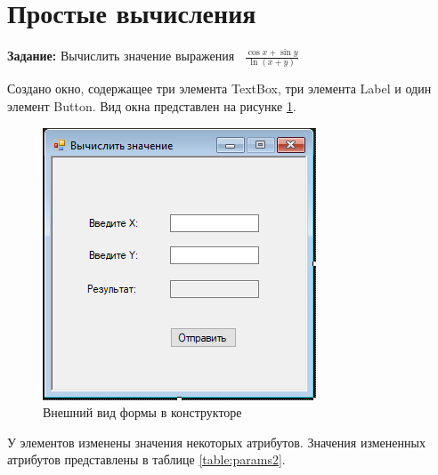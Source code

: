 \section{Простые вычисления}

\textbf{Задание:} Вычислить значение выражения ~$\displaystyle \frac{\cos{x} + \sin{y}}{\ln(x + y)}$
\vspace{0.25cm}

Создано окно, содержащее три элемента TextBox, три элемента Label и 
один элемент Button. Вид окна представлен на рисунке \ref{fig:form2}.

\begin{figure}[H]
    \centering
    \includegraphics{task2/form.png}
    \caption{Внешний вид формы в конструкторе}
    \label{fig:form2}
\end{figure}

У элементов изменены значения некоторых атрибутов. 
Значения измененных атрибутов представлены в таблице \ref{table:params2}.


